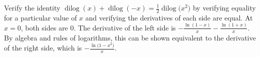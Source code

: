 {Verify the identity $\operatorname{dilog}(x)+\operatorname{dilog}(-x)=\frac{1}{2}\operatorname{dilog}\big(x^2\big)$ by verifying equality for a particular value of $x$ and verifying the derivatives of each side are equal.
}
{At $x=0$, both sides are 0.  The derivative of the left side is $-\frac{\ln(1-x)}{x}-\frac{\ln(1+x)}{x}$.  By algebra and rules of logarithms, this can be shown equivalent to the derivative of the right side, which is $-\frac{\ln\big(1-x^2\big)}{x}$.
}